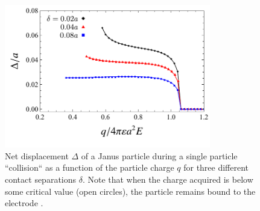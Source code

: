 \begin{appendices}
\begin{figure}[h]
    \centering
    \includegraphics[width=9cm]{figures/A1_Displacement.pdf}
    \caption{Net displacement $\Delta$ of a Janus particle during a single particle ``collision`` as a function of the particle charge $q$ for three different contact separations $\delta$. Note that when the charge acquired is below some critical value (open circles), the particle remains bound to the electrode \autocite{drews2015contact}.}
    \label{fig:Displacement}
\end{figure}








\end{appendices}